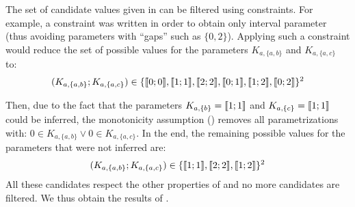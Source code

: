 \begin{example}

The set of candidate values given in  can be filtered using constraints.
For example, a constraint was written in order to obtain only interval parameter
(thus avoiding parameters with “gaps” such as $\{ 0, 2 \}$).
Applying such a constraint would reduce the set of possible values for the parameters $K_{a,\{a,b\}}$ and $K_{a,\{a,c\}}$ to:
\begin{align*}
  (K_{a,\{a,b\}} ; K_{a,\{a,c\}}) \in \{ \llbracket 0 ; 0 \rrbracket , \llbracket 1 ; 1 \rrbracket , \llbracket 2 ; 2 \rrbracket , \llbracket 0 ; 1 \rrbracket , \llbracket 1 ; 2 \rrbracket , \llbracket 0 ; 2 \rrbracket \}^2
\end{align*}

Then, due to the fact that the parameters $K_{a,\{b\}} = \llbracket 1 ; 1 \rrbracket$ and $K_{a,\{c\}} = \llbracket 1 ; 1 \rrbracket$ could be inferred,
the monotonicity assumption () removes all parametrizations with: $0 \in K_{a,\{a,b\}} \vee 0 \in K_{a,\{a,c\}}$.
In the end, the remaining possible values for the parameters that were not inferred are:
\begin{align*}
  (K_{a,\{a,b\}} ; K_{a,\{a,c\}}) \in \{ \llbracket 1 ; 1 \rrbracket , \llbracket 2 ; 2 \rrbracket , \llbracket 1 ; 2 \rrbracket \}^2
\end{align*}
All these candidates respect the other properties of  and no more candidates are filtered.
We thus obtain the results of .
\end{example}



